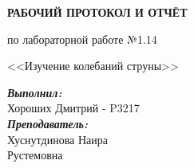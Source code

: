 \documentclass[12pt, a4paper]{article}
\begin{document}

\vspace*{0.25\textheight}
\begin{center}
\textbf{\LARGE РАБОЧИЙ ПРОТОКОЛ И ОТЧЁТ }

\LARGE по лабораторной работе №1.14

\LARGE <<Изучение колебаний струны>>

\end{center}
\vspace*{5cm}
\begin{flushright}
\begin{minipage}{.33\linewidth}
\textit{\textbf{Выполнил:}}\\
Хороших Дмитрий - P3217\\
\textit{\textbf{Преподаватель:}}\\
Хуснутдинова Наира\\ Рустемовна
\end{minipage}
\end{flushright}


\thispagestyle{firstpage}
\newpage
\tableofcontents

\restoregeometry
\end{document}
